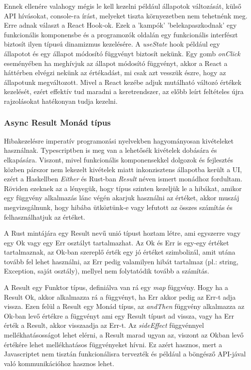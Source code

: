 Ennek ellenére valahogy mégis le kell kezelni például állapotok változását, külső API hívásokat, console-ra írást, melyeket tiszta környezetben nem tehetnénk meg. Erre adnak választ a React Hook-ok. Ezek a 'kampók' 'belekapaszkodnak' egy funkcionális komponensbe és a programozók oldalán egy funkcionális interfészt biztosít ilyen típusú dinamizmus kezelésére. A \textit{useState} hook például egy állapotot és egy állapot módosító függvényt biztosít nekünk. Egy gomb \textit{onClick} eseményében ha meghívjuk az állapot módosító függvényt, akkor a React a háttérben elvégzi nekünk az értékadást, mi csak azt vesszük észre, hogy az állapotunk megváltozott. Mivel a React kezébe adjuk mutálható változó értékek kezelését, ezért effektív tud maradni a keretrendszer, az előbb leírt feltételes újra rajzolásokat hatékonyan tudja kezelni.

\subsubsection{Async Result Monád típus}

Hibakezelésre imperatív programozási nyelvekben hagyományosan kivételeket használnak. Typescriptben is meg van a lehetősék kivételek dobására és elkapására. Viszont, mivel funkcionális komponensekkel dolgozok és fejlesztés közben párszor nem lekezelt kivételek miatt inkonzisztens állapotba került a UI, ezért a Haskellben \textit{Either} és Rust-ban \textit{Result} néven ismert monádhoz fordultam. Röviden ezeknek az a lényegük, hogy típus szinten kezeljük le a hibákat, amikor egy függvény alkalmazás lánc végén akarjuk használni az értéket, akkor muszáj megvizsgálnunk, hogy hibába ütköztünk-e vagy lefutott az összes számítás és felhasználhatjuk az értéket.

A Rust mintájára egy Result nevű unió típust\cite{tsUnionTypes} hoztam létre, ami egyszerre vagy egy Ok vagy egy Err osztályt tartalmazhat. Az Ok és Err is egy-egy értéket tartalmaznak, az Ok-ban szereplő érték egy jó értéket szimbolizál, amit utána tovább fel lehet használni, az Err pedig valamilyen hibát tartalmaz (pl.: string, Exception, saját osztály), mellyel nem folytatódik tovább a számítás.

A Result egy Funktor típus, definiálva van rá egy \textit{map} függvény. Hogy ha a Result Ok, akkor alkalmazza rá a függvényt, ha Err akkor pedig az Err-t adja vissza. Ezen felül a Result egy Monád típus, az \textit{andThen} függvény alkalmazza az Ok-ban levő értékre a függvényt ami egy Result típust ad vissza, vagy ha Err érték a Result, akkor visszaadja az Err-t. Az \textit{sideEffect} függvénnyel mellékhatásosságot lehet elérni, a Result marad ugyan az, viszont az Okban levő értékére lehet mellékhatásos függvényeket hívni. Ez azért hasznos, mert a Javascriptet nem tisztán funkcionálisra tervezték és például a böngésző API-jával való kommunikációhoz hasznos lehet.

